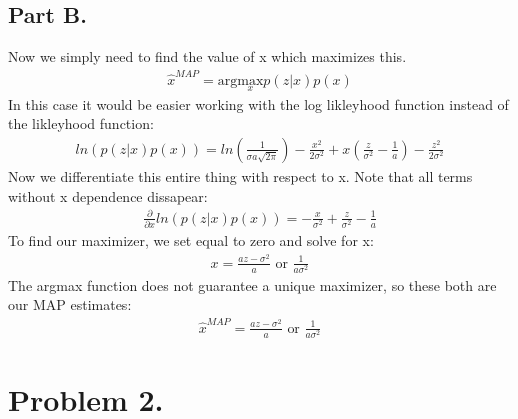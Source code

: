 \documentclass{article}
\begin{document}
\subsection*{Part B.}
Now we simply need to find the value of x which maximizes this.
\begin{align*}
\hat{x}^{MAP} = \text{arg} \underset{x}{\text{max}} p(z|x)p(x)
\end{align*}
In this case it would be easier working with the log likleyhood function instead of the likleyhood function:
\begin{align*}
ln(p(z|x) p(x)) = ln(\frac{1}{\sigma a \sqrt{2\pi}}) -\frac{x^2}{2\sigma^2} + x(\frac{z}{\sigma^2} - \frac{1}{a}) - \frac{z^2}{2\sigma^2}
\end{align*}
Now we differentiate this entire thing with respect to x. Note that all terms without x dependence dissapear:
\begin{align*}
\frac{\partial}{\partial x} ln(p(z|x) p(x)) =  -\frac{x}{\sigma^2} + \frac{z}{\sigma^2} - \frac{1}{a}
\end{align*}
To find our maximizer, we set equal to zero and solve for x:
\begin{align*}
x = \frac{a z - \sigma^2}{a} \text{ or } \frac{1}{a \sigma^2}
\end{align*}
The argmax function does not guarantee a unique maximizer, so these both are our MAP estimates:
\begin{align*}
\boxed{ \hat{x}^{MAP} = \frac{a z - \sigma^2}{a} \text{ or } \frac{1}{a \sigma^2} }
\end{align*}


\clearpage
\section*{Problem 2.}
\end{document}
